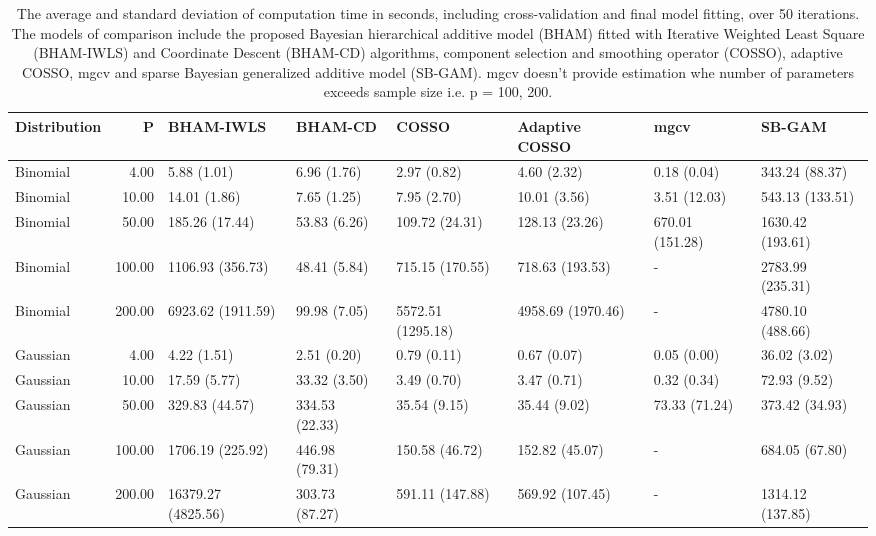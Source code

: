 \documentclass[AMA,STIX1COL,]{WileyNJD-v2}
\begin{document}
\clearpage

\begin{sidewaystable}[!h]
\centering
\begin{tabular}{lrllllll}
  \hline
Distribution & P & BHAM-IWLS & BHAM-CD & COSSO & Adaptive COSSO & mgcv & SB-GAM \\ 
  \hline
Binomial & 4.00 & 5.88 (1.01) & 6.96 (1.76) & 2.97 (0.82) & 4.60 (2.32) & 0.18 (0.04) & 343.24 (88.37) \\ 
  Binomial & 10.00 & 14.01 (1.86) & 7.65 (1.25) & 7.95 (2.70) & 10.01 (3.56) & 3.51 (12.03) & 543.13 (133.51) \\ 
  Binomial & 50.00 & 185.26 (17.44) & 53.83 (6.26) & 109.72 (24.31) & 128.13 (23.26) & 670.01 (151.28) & 1630.42 (193.61) \\ 
  Binomial & 100.00 & 1106.93 (356.73) & 48.41 (5.84) & 715.15 (170.55) & 718.63 (193.53) & - & 2783.99 (235.31) \\ 
  Binomial & 200.00 & 6923.62 (1911.59) & 99.98 (7.05) & 5572.51 (1295.18) & 4958.69 (1970.46) & - & 4780.10 (488.66) \\ 
  Gaussian & 4.00 & 4.22 (1.51) & 2.51 (0.20) & 0.79 (0.11) & 0.67 (0.07) & 0.05 (0.00) & 36.02 (3.02) \\ 
  Gaussian & 10.00 & 17.59 (5.77) & 33.32 (3.50) & 3.49 (0.70) & 3.47 (0.71) & 0.32 (0.34) & 72.93 (9.52) \\ 
  Gaussian & 50.00 & 329.83 (44.57) & 334.53 (22.33) & 35.54 (9.15) & 35.44 (9.02) & 73.33 (71.24) & 373.42 (34.93) \\ 
  Gaussian & 100.00 & 1706.19 (225.92) & 446.98 (79.31) & 150.58 (46.72) & 152.82 (45.07) & - & 684.05 (67.80) \\ 
  Gaussian & 200.00 & 16379.27 (4825.56) & 303.73 (87.27) & 591.11 (147.88) & 569.92 (107.45) & - & 1314.12 (137.85) \\ 
   \hline
\end{tabular}
\caption{The average and standard deviation of computation time in seconds, including cross-validation and final model fitting, over 50 iterations. The models of comparison include the proposed Bayesian hierarchical additive model (BHAM) fitted with Iterative Weighted Least Square (BHAM-IWLS) and Coordinate Descent (BHAM-CD) algorithms, component selection and smoothing operator (COSSO), adaptive COSSO, mgcv and sparse Bayesian generalized additive model (SB-GAM). mgcv doesn't provide estimation whe number of parameters exceeds sample size i.e. p = 100, 200.} 
\label{tab:time_sim}
\end{sidewaystable}
\end{document}
